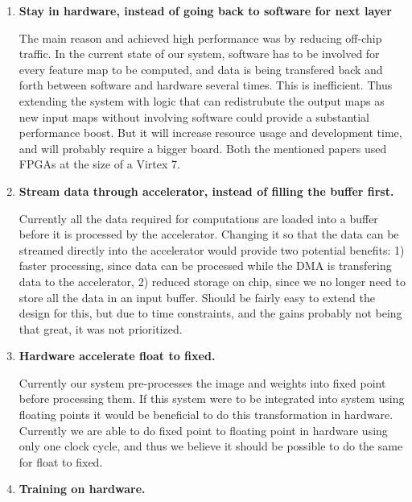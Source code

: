 \begin{enumerate}
	\item \textbf{Stay in hardware, instead of going back to software for next layer}
	
	The main reason \cite{Zhang2015} and \cite{Ovtcharov2015} achieved high performance was by reducing off-chip traffic. In the current state of our system, software has to be involved for every feature map to be computed, and data is being transfered back and forth between software and hardware several times. This is inefficient. Thus extending the system with logic that can redistrubute the output maps as new input maps without involving software could provide a substantial performance boost. But it will increase resource usage and development time, and will probably require a bigger board. Both the mentioned papers used FPGAs at the size of a Virtex 7.  
	
	\item \textbf{Stream data through accelerator, instead of filling the buffer first.}
	
	Currently all the data required for computations are loaded into a buffer before it is processed by the accelerator. Changing it so that the data can be streamed directly into the accelerator would provide two potential benefits: 1) faster processing, since data can be processed while the DMA is transfering data to the accelerator, 2) reduced storage on chip, since we no longer need to store all the data in an input buffer. Should be fairly easy to extend the design for this, but due to time constraints, and the gains probably not being that great, it was not prioritized. 
	
	\item \textbf{Hardware accelerate float to fixed.}
	
	Currently our system pre-processes the image and weights into fixed point before processing them. If this system were to be integrated into system using floating points it would be beneficial to do this transformation in hardware. Currently we are able to do fixed point to floating point in hardware using only one clock cycle, and thus we believe it should be possible to do the same for float to fixed. 
	
	\item \textbf{Training on hardware.}
	
\end{enumerate}
